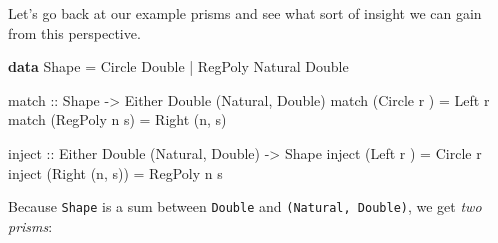 \documentclass[]{article}
\newenvironment{Shaded}{}{}
\newcommand{\DataTypeTok}[1]{\textcolor[rgb]{0.56,0.13,0.00}{#1}}
\newcommand{\FunctionTok}[1]{\textcolor[rgb]{0.02,0.16,0.49}{#1}}
\newcommand{\KeywordTok}[1]{\textcolor[rgb]{0.00,0.44,0.13}{\textbf{#1}}}
\newcommand{\NormalTok}[1]{#1}
\newcommand{\OtherTok}[1]{\textcolor[rgb]{0.00,0.44,0.13}{#1}}
\begin{document}
Let's go back at our example prisms and see what sort of insight we can gain
from this perspective.

\begin{Shaded}
\begin{Highlighting}[]
\KeywordTok{data} \DataTypeTok{Shape} \FunctionTok{=} \DataTypeTok{Circle}  \DataTypeTok{Double}
           \FunctionTok{|} \DataTypeTok{RegPoly} \DataTypeTok{Natural} \DataTypeTok{Double}

\OtherTok{match ::} \DataTypeTok{Shape} \OtherTok{->} \DataTypeTok{Either} \DataTypeTok{Double}\NormalTok{ (}\DataTypeTok{Natural}\NormalTok{, }\DataTypeTok{Double}\NormalTok{)}
\NormalTok{match (}\DataTypeTok{Circle}\NormalTok{  r  ) }\FunctionTok{=} \DataTypeTok{Left}\NormalTok{ r}
\NormalTok{match (}\DataTypeTok{RegPoly}\NormalTok{ n s) }\FunctionTok{=} \DataTypeTok{Right}\NormalTok{ (n, s)}

\OtherTok{inject ::} \DataTypeTok{Either} \DataTypeTok{Double}\NormalTok{ (}\DataTypeTok{Natural}\NormalTok{, }\DataTypeTok{Double}\NormalTok{) }\OtherTok{->} \DataTypeTok{Shape}
\NormalTok{inject (}\DataTypeTok{Left}\NormalTok{   r    ) }\FunctionTok{=} \DataTypeTok{Circle}\NormalTok{  r}
\NormalTok{inject (}\DataTypeTok{Right}\NormalTok{ (n, s)) }\FunctionTok{=} \DataTypeTok{RegPoly}\NormalTok{ n s}
\end{Highlighting}
\end{Shaded}

Because \texttt{Shape} is a sum between \texttt{Double} and
\texttt{(Natural,\ Double)}, we get \emph{two prisms}:
\end{document}

